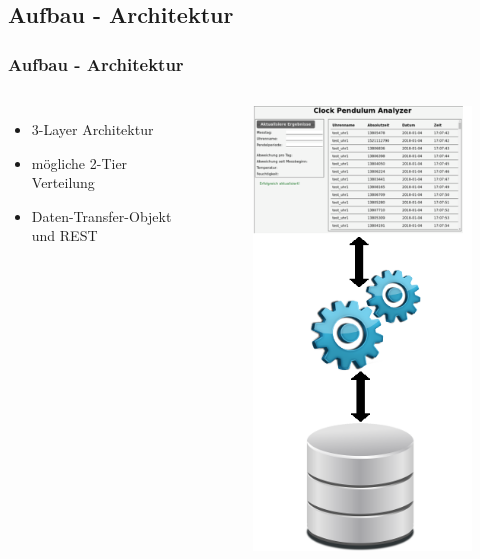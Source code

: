 \subsection{Aufbau - Architektur}
\begin{frame}
    \frametitle{Aufbau - Architektur}
    \begin{columns}[c] %
        \begin{itemize}
            \item<1->3-Layer Architektur
            \item<1->mögliche 2-Tier Verteilung
            \item<1->Daten-Transfer-Objekt und REST
        \end{itemize}
        \begin{figure}
            \centering
            \begin{overprint}
                \includegraphics[width=.5\textwidth]{3layer.png}

\end{overprint}
\end{figure}
\end{columns}
\end{frame}
